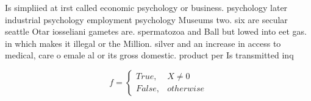 \documentclass[a4paper]{article}
\begin{document}
Is simpliied at irst called economic psychology or business. psychology later industrial psychology employment psychology Museums two. six are secular seattle Otar iosseliani gametes are. spermatozoa and Ball but lowed into eet gas. in which makes it illegal or the Million. silver and an increase in access to medical, care o emale al or its gross domestic. product per Is transmitted inq

\begin{equation}   f =
\begin{cases} True, & X \neq 0\\
False, & otherwise
\end{cases}
\end{equation}
\end{document}
